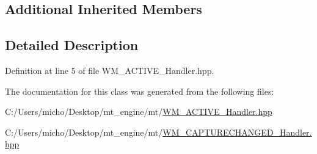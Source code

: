\subsection*{Additional Inherited Members}


\subsection{Detailed Description}


Definition at line 5 of file W\+M\+\_\+\+A\+C\+T\+I\+V\+E\+\_\+\+Handler.\+hpp.



The documentation for this class was generated from the following files\+:\begin{DoxyCompactItemize}
\item 
C\+:/\+Users/micho/\+Desktop/mt\+\_\+engine/mt/\hyperlink{_w_m___a_c_t_i_v_e___handler_8hpp}{W\+M\+\_\+\+A\+C\+T\+I\+V\+E\+\_\+\+Handler.\+hpp}\item 
C\+:/\+Users/micho/\+Desktop/mt\+\_\+engine/mt/\hyperlink{_w_m___c_a_p_t_u_r_e_c_h_a_n_g_e_d___handler_8hpp}{W\+M\+\_\+\+C\+A\+P\+T\+U\+R\+E\+C\+H\+A\+N\+G\+E\+D\+\_\+\+Handler.\+hpp}\end{DoxyCompactItemize}
